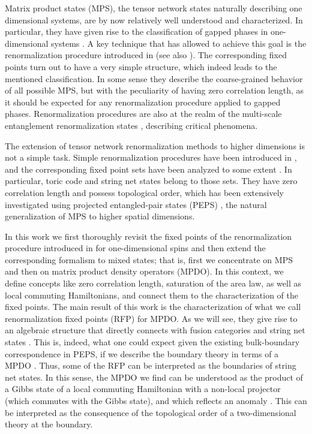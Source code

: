 \documentclass{elsarticle}
\begin{document}
Matrix product states (MPS), the tensor network states naturally describing one
dimensional systems, are by now relatively well understood and characterized.
In particular, they have given rise to the classification of gapped phases in
one-dimensional systems \cite{Wen,Norbertphases,Pollamann}. A key technique
that has allowed to achieve this goal is the renormalization procedure introduced
in \cite{Latorre} (see also \cite{Wen}). The corresponding fixed points turn out to have a very
simple structure, which indeed leads to the mentioned classification. In some sense
they describe the coarse-grained behavior of all possible MPS, but with the
peculiarity of having zero correlation length, as it should be expected for
any renormalization procedure applied to gapped phases. Renormalization
procedures are also at the realm of the multi-scale entanglement renormalization
states \cite{Mera}, describing critical phenomena.

The extension of tensor network renormalization methods to higher dimensions is
not a simple task. Simple renormalization procedures have been introduced in
\cite{WenRG2D,VidalRG2D}, and the corresponding fixed point sets have been analyzed to
some extent \cite{WenRGFP}. In particular, toric code \cite{Toric} and string net states
\cite{StringNet} belong to those sets. They have zero correlation length and
possess topological order, which has been extensively investigated using
projected entangled-pair states (PEPS) \cite{PEPS1,PEPS2}, the natural generalization of MPS to
higher spatial dimensions.

In this work we first thoroughly revisit the fixed points of the renormalization
procedure introduced in \cite{Latorre} for one-dimensional spins and then extend
the corresponding formalism to mixed states; that is, first we concentrate on MPS and
then on matrix product density operators (MPDO). In this context, we define concepts
like zero correlation length, saturation of the area law, as well as local
commuting Hamiltonians, and connect them to the characterization of the
fixed points. The main result of this work is the characterization of
what we call renormalization fixed points (RFP) for MPDO. As we will see, they
give rise to an algebraic structure that directly connects with fusion categories and
 string net states \cite{StringNet,FrankStrings}. This is, indeed, what one
could expect given the existing bulk-boundary correspondence in PEPS, if we
describe the boundary theory in terms of a MPDO \cite{bulkboundary}. Thus, some of the
RFP can be interpreted as the boundaries of string net states. In this sense,
the MPDO we find can be understood \cite{bulkboundconj} as the product of a Gibbs state of a local
commuting Hamiltonian with a non-local projector (which commutes with the
Gibbs state), and which reflects an anomaly
\cite{anomaly}. This can be interpreted as the consequence of the topological order
of a two-dimensional theory at the boundary.
\end{document}
